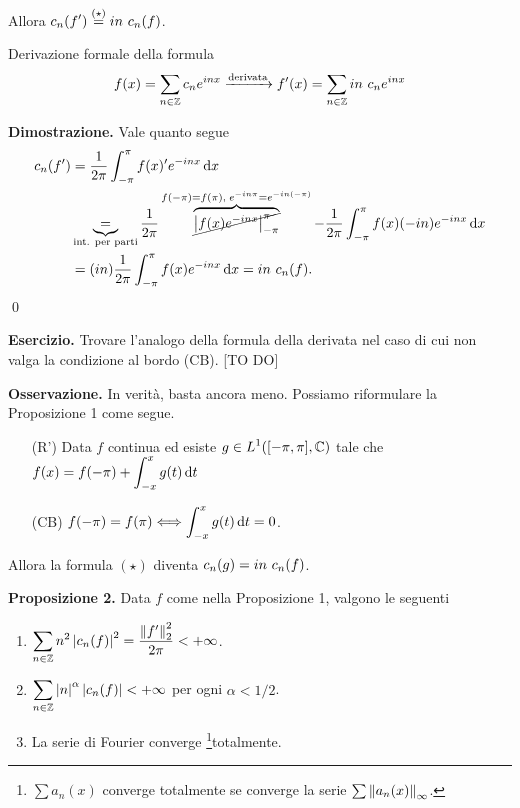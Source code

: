 Allora $\displaystyle c_n(f') \overset{(\star)}{=} in \ c_n(f)$.

Derivazione formale della formula
%
$$
f(x) = \sum_{n \in \mathbb Z} c_n e^{inx} \xrightarrow{\text{derivata}} f'(x) = \sum_{n \in \mathbb Z} in \ c_n e^{inx} 
$$
%

\textbf{Dimostrazione.} Vale quanto segue
\begin{align*}
c_n(f') & = \frac{1}{2\pi} \int_{-\pi}^\pi f(x)' e^{-inx} \dd x \\
& \underbrace{=}_{\text{int. per parti}} \frac{1}{2\pi} \overbrace{\cancel{\left| f(x) e^{-inx} \right|_{-\pi}^\pi}}^{f(-\pi) = f(\pi), \; e^{-in\pi} = e^{-in (-\pi)}} - \frac{1}{2\pi} \int_{-\pi}^\pi f(x) (-in) e^{-inx} \dd x \\
& = (in) \frac{1}{2\pi} \int_{-\pi}^\pi f(x) e^{-inx} \dd x = in \ c_n(f).
\end{align*} 
\qed

\textbf{Esercizio.} Trovare l'analogo della formula della derivata nel caso di cui non valga la condizione al bordo (CB). [TO DO]

\textbf{Osservazione.} In verità, basta ancora meno. Possiamo riformulare la Proposizione 1 come segue.
\begin{itemize}
\item[(R')] Data $f$ continua ed esiste $\displaystyle g \in L^1([-\pi,\pi], \mathbb C) $ tale che $\displaystyle f(x) = f(-\pi) + \int_{-x}^x g(t) \,\mathrm{d} t $ 

\item[(CB)] $\displaystyle f(-\pi) = f(\pi) \Longleftrightarrow \int_{-x}^x g(t) \,\mathrm{d} t = 0 $.
\end{itemize}
Allora la formula $(\star)$ diventa $\displaystyle c_n(g) = in \ c_n(f)$.

\textbf{Proposizione 2.} Data $f$ come nella Proposizione 1, valgono le seguenti
\begin{enumerate}
\item $\displaystyle \sum_{n \in \mathbb Z} n^2 \left| c_n(f) \right|^2 = \frac{\left\lVert f' \right\rVert_2^2}{2\pi} < +\infty$.

\item $\displaystyle \sum_{n \in \mathbb Z} \left| n \right|^\alpha \left| c_n(f) \right| < +\infty $ per ogni $\alpha < 1/2$.

\item La serie di Fourier converge \footnote{$\sum a_n(x)$ converge totalmente se converge la serie $\sum \left\lVert a_n (x) \right\rVert_\infty$.}{totalmente}.
\end{enumerate}

